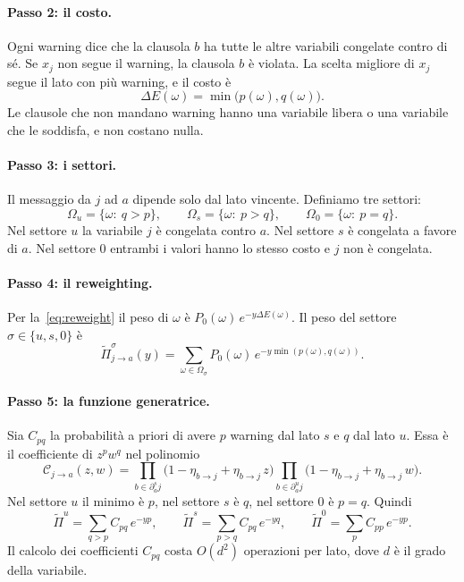 \paragraph{Passo 2: il costo.}
Ogni warning dice che la clausola $b$ ha tutte le altre variabili congelate contro di sé.
Se $x_j$ non segue il warning, la clausola $b$ è violata.
La scelta migliore di $x_j$ segue il lato con più warning, e il costo è
\begin{equation}
\Delta E(\omega)=\min\bigl(p(\omega),q(\omega)\bigr).
\label{eq:cost}
\end{equation}
Le clausole che non mandano warning hanno una variabile libera o una variabile che le soddisfa, e non costano nulla.

\paragraph{Passo 3: i settori.}
Il messaggio da $j$ ad $a$ dipende solo dal lato vincente.
Definiamo tre settori:
\begin{equation}
\Omega_u=\{\omega:\ q>p\},\qquad\Omega_s=\{\omega:\ p>q\},\qquad\Omega_0=\{\omega:\ p=q\}.
\end{equation}
Nel settore $u$ la variabile $j$ è congelata contro $a$.
Nel settore $s$ è congelata a favore di $a$.
Nel settore $0$ entrambi i valori hanno lo stesso costo e $j$ non è congelata.

\paragraph{Passo 4: il reweighting.}
Per la~\eqref{eq:reweight} il peso di $\omega$ è $P_0(\omega)\,e^{-y\Delta E(\omega)}$.
Il peso del settore $\sigma\in\{u,s,0\}$ è
\begin{equation}
\widetilde\Pi^\sigma_{j\to a}(y)=\sum_{\omega\in\Omega_\sigma}P_0(\omega)\,e^{-y\min(p(\omega),q(\omega))}.
\label{eq:sector}
\end{equation}

\paragraph{Passo 5: la funzione generatrice.}
Sia $C_{pq}$ la probabilità a priori di avere $p$ warning dal lato $s$ e $q$ dal lato $u$.
Essa è il coefficiente di $z^pw^q$ nel polinomio
\begin{equation}
\mathcal C_{j\to a}(z,w)=\prod_{b\in\partial^s_aj}\bigl(1-\eta_{b\to j}+\eta_{b\to j}\,z\bigr)\prod_{b\in\partial^u_aj}\bigl(1-\eta_{b\to j}+\eta_{b\to j}\,w\bigr).
\label{eq:genfun}
\end{equation}
Nel settore $u$ il minimo è $p$, nel settore $s$ è $q$, nel settore $0$ è $p=q$.
Quindi
\begin{equation}
\widetilde\Pi^u=\sum_{q>p}C_{pq}\,e^{-yp},\qquad
\widetilde\Pi^s=\sum_{p>q}C_{pq}\,e^{-yq},\qquad
\widetilde\Pi^0=\sum_{p}C_{pp}\,e^{-yp}.
\label{eq:sectors-explicit}
\end{equation}
Il calcolo dei coefficienti $C_{pq}$ costa $O(d^2)$ operazioni per lato, dove $d$ è il grado della variabile.

